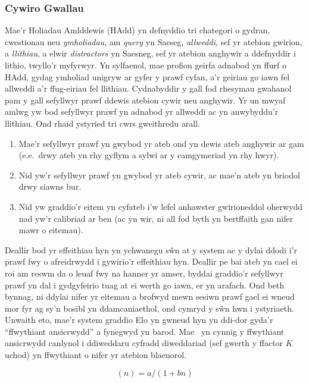 \subsubsection{Cywiro Gwallau}
Mae'r Holiadau Amlddewis (HAdd) yn defnyddio tri chategori o gydran, cwestionau neu \textit{ymholiadau}, am \textit{query} yn Saeseg, \textit{allweddi}, sef yr atebion gwirion, a \textit{llithiau}, a elwir \textit{distractors} yn Saesneg, sef yr atebion anghywir a ddefnyddir i lithio, twyllo'r myfyrwyr. Yn sylfaenol, mae profion geirfa adnabod yn ffurf o HAdd, gydag ymholiad unigryw ar gyfer y prawf cyfan, a'r geiriau go iawn fel allweddi a'r ffug-eiriau fel llithiau. Cydnabyddir y gall fod rhesymau gwahanol pam y gall sefyllwyr prawf ddewis atebion cywir neu anghywir. Yr un mwyaf amlwg yw bod sefyllwyr prawf yn adnabod yr allweddi ac yn anwybyddu'r llithiau. Ond rhaid ystyried tri cwrs gweithredu arall.
\begin{enumerate}
    \item Mae'r sefyllwyr prawf yn gwybod yr ateb ond yn dewis ateb anghywir ar gam (e.e.\ drwy ateb yn rhy gyflym a sylwi ar y camgymeriad yn rhy hwyr).
    \item Nid yw'r sefyllwyr prawf yn gwybod yr ateb cywir, ac mae'n ateb yn briodol drwy siawns bur.
    \item Nid yw graddio'r eitem yn cyfateb i'w lefel anhawster gwirioneddol oherwydd nad yw'r calibriad ar ben (ac yn wir, ni all fod byth yn bertffaith gan nifer mawr o eitemau).
\end{enumerate}
Deallir bod yr effeithiau hyn yn ychwanegu sŵn at y system ac y dylai ddodi i'r prawf fwy o afreidrwydd i gywirio'r effeithiau hyn. Deallir pe bai ateb yn cael ei roi am reswm da o leuaf fwy na hanner yr amser, byddai graddio'r sefyllwyr prawf yn dal i gydgyfeirio tuag at ei werth go iawn, er yn arafach. Ond beth bynnag, ni ddylai nifer yr eitemau a brofwyd mewn sesiwn prawf gael ei wneud mor fyr ag sy'n bosibl yn ddamcaniaethol, ond cymryd y sŵn hwn i ystyriaeth. Unwaith eto, mae'r system graddio Elo yn gwneud hyn yn ddi-dor gyda'r ``ffwythiant ansicrwydd'' a fynegwyd yn barod. Mae~\cite{pelanek_applications_2016} yn cynnig y ffwythiant ansicrwydd canlynol i ddiweddaru cyfradd diweddariad (sef gwerth y ffactor $K$ uchod) yn ffwythiant o nifer yr atebion blaenorol.

\begin{equation}
    (n)=a/(1 + bn)
\end{equation}\label{eq:uncertainty-function}

